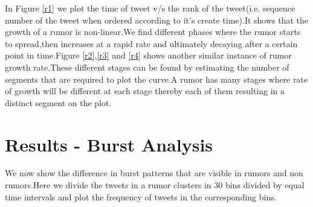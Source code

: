  
  In Figure \ref{r1} we plot the time of tweet v/s the rank of the tweet(i.e. sequence number of the tweet when ordered according to it's create time).It shows that the growth of a rumor is non-linear.We find different phases where the rumor starts to spread,then increases at a rapid rate and ultimately decaying after a certain point in time.Figure \ref{r2},\ref{r3} and \ref{r4} shows another similar instance of rumor growth rate.These different stages can be found by estimating the number of segments that are required to plot the curve.A rumor has many stages where rate of growth will be different at each stage thereby each of them resulting in a distinct segment on the plot.
 

 \section{Results - Burst Analysis }
 
 We now show the difference in burst patterns that are visible in rumors and non rumors.Here we divide the tweets in a rumor clusters in 30 bins divided by equal time intervals and plot the frequency of tweets in the corresponding bins.
 
